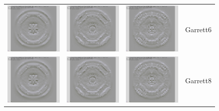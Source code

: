 \documentclass{article}
\begin{document}
\begin{figure}
\begin{center}
\begin{tabular}{cccl}
\includegraphics[width=1.5in]{../graphics/wedge1/garret6_width4_dxhi.jpg} &
\includegraphics[width=1.5in]{../graphics/wedge1/garret6_width6_dxhi.jpg} &
\includegraphics[width=1.5in]{../graphics/wedge1/garret6_width8_dxhi.jpg} &  Garrett6\\
\includegraphics[width=1.5in]{../graphics/wedge1/garret8_width4_dxhi.jpg} &
\includegraphics[width=1.5in]{../graphics/wedge1/garret8_width6_dxhi.jpg} &
\includegraphics[width=1.5in]{../graphics/wedge1/garret8_width8_dxhi.jpg} &  Garrett8

\end{tabular}
\end{center}
\end{figure}
\end{document}
